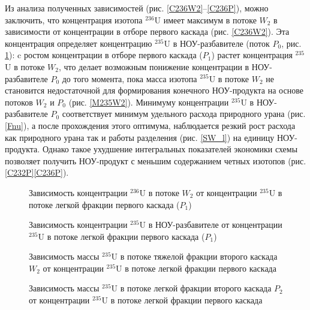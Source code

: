Из анализа полученных зависимостей (рис. \ref{C236W2}--\ref{C236P}), можно заключить, что концентрация изотопа $^{236}$U имеет максимум в потоке $W_2$ в зависимости от концентрации в отборе первого каскада (рис. \ref{C236W2}). Эта концентрация определяет концентрацию $^{235}$U в НОУ-разбавителе (поток $P_0$, рис. \ref{C235P0}): c ростом концентрации в отборе первого каскада ($P_1$) растет концентрация $^{235}$U в потоке $W_2$, что делает возможным понижение концентрации в НОУ-разбавителе $P_0$ до того момента, пока масса изотопа $^{235}$U в потоке $W_2$ не становится недостаточной для формирования конечного НОУ-продукта на основе потоков $W_2$ и $P_0$ (рис. \ref{M235W2}). Минимуму концентрации $^{235}$U в НОУ-разбавителе $P_0$ соответствует минимум удельного расхода природного урана (рис. \ref{Fnu}), а после прохождения этого оптимума, наблюдается резкий рост расхода как природного урана так и работы разделения (рис. \ref{SW_l}) на единицу НОУ-продукта. Однако такое ухудшение интегральных показателей экономики схемы позволяет получить НОУ-продукт с меньшим содержанием четных изотопов (рис. \ref{C232P}\ref{C236P}).

\begin{figure}[ht]
    \centering
    \begin{minipage}{.5\textwidth}
      \centering
      
\caption{{Зависимость  концентрации $^{236}$U в потоке $W_2$ от концентрации $^{235}$U в потоке легкой фракции первого каскада ($P_1$){\label{C236W2}}}}
    \end{minipage}%
    \begin{minipage}{.5\textwidth}
      \centering
      
\caption{{Зависимость концентрации $^{235}$U в НОУ-разбавителе от концентрации $^{235}$U в потоке легкой фракции первого каскада ($P_1$){\label{C235P0}}}}
\end{minipage}
\end{figure}


\begin{figure}[ht]
    \centering
    \begin{minipage}{.5\textwidth}
      \centering
      
\caption{{Зависимость массы $^{235}$U в потоке тяжелой фракции второго каскада $W_2$ от концентрации $^{235}$U в потоке легкой фракции первого каскада{\label{M235W2}}}}
    \end{minipage}%
    \begin{minipage}{.5\textwidth}
      \centering
      
\caption{{Зависимость массы $^{235}$U в потоке легкой фракции второго каскада $P_2$ от концентрации $^{235}$U в потоке легкой фракции первого каскада{\label{M235P2}}}}
\end{minipage}
\end{figure}


